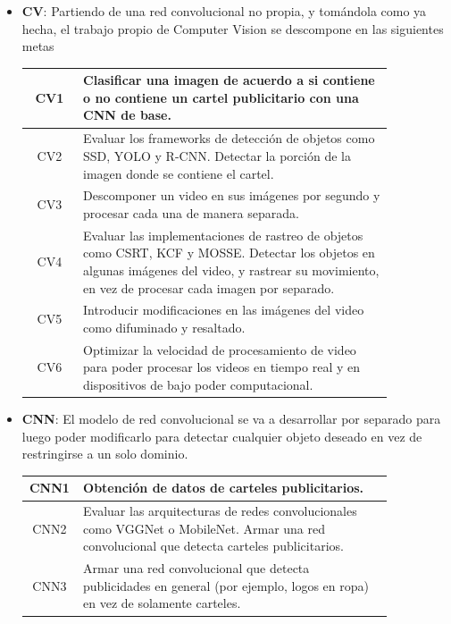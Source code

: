 \documentclass[a4paper]{article}
\begin{document}
\begin{itemize}
\item \textbf{CV}: Partiendo de una red convolucional no propia, y tomándola como ya hecha, el trabajo propio de Computer Vision se descompone en las siguientes metas

\begin{center}
\begin{tabular}{c m{0.85\linewidth}} \toprule
    CV1 & Clasificar una imagen de acuerdo a si contiene o no contiene un cartel publicitario con una CNN de base. \\ \midrule
    CV2 & Evaluar los frameworks de detección de objetos como SSD, YOLO y R-CNN. \newline Detectar la porción de la imagen donde se contiene el cartel. \\ \midrule
    CV3 & Descomponer un video en sus imágenes por segundo y procesar cada una de manera separada. \\ \midrule
    CV4 & Evaluar las implementaciones de rastreo de objetos como CSRT, KCF y MOSSE. \newline Detectar los objetos en algunas imágenes del video, y rastrear su movimiento, en vez de procesar cada imagen por separado. \\ \midrule
    CV5 & Introducir modificaciones en las imágenes del video como difuminado y resaltado. \\ \midrule
    CV6 & Optimizar la velocidad de procesamiento de video para poder procesar los videos en tiempo real y en dispositivos de bajo poder computacional. \\ \bottomrule
\end{tabular}
\end{center}

\item \textbf{CNN}: El modelo de red convolucional se va a desarrollar por separado para luego poder modificarlo para detectar cualquier objeto deseado en vez de restringirse a un solo dominio.

\begin{center}
\begin{tabular}{c m{0.85\linewidth}} \toprule
    CNN1 & Obtención de datos de carteles publicitarios. \\ \midrule
    CNN2 & Evaluar las arquitecturas de redes convolucionales como VGGNet o MobileNet. \newline Armar una red convolucional que detecta carteles publicitarios. \\ \midrule
    CNN3 & Armar una red convolucional que detecta publicidades en general (por ejemplo, logos en ropa) en vez de solamente carteles. \\ \bottomrule
\end{tabular}
\end{center}


\end{itemize}
\end{document}
